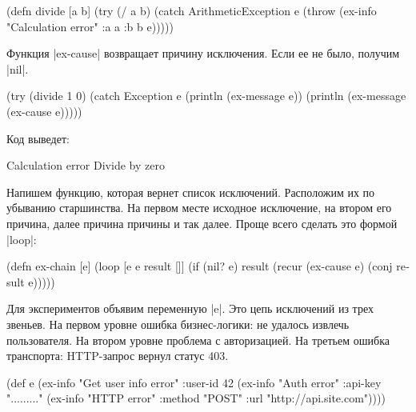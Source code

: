 \begin{english}
  \begin{clojure}
(defn divide [a b]
  (try
    (/ a b)
    (catch ArithmeticException e
      (throw (ex-info
              "Calculation error"
              {:a a :b b}
              e)))))
  \end{clojure}
\end{english}

Функция \spverb|ex-cause| возвращает причину исключения. Если ее не было,
получим \spverb|nil|.

\begin{english}
  \begin{clojure}
(try
  (divide 1 0)
  (catch Exception e
    (println (ex-message e))
    (println (ex-message (ex-cause e)))))
  \end{clojure}
\end{english}

\noindent
Код выведет:

\begin{english}
  \begin{text}
Calculation error
Divide by zero
  \end{text}
\end{english}

Напишем функцию, которая вернет список исключений. Расположим их по убыванию
старшинства. На первом месте исходное исключение, на втором его причина, далее
причина причины и так далее. Проще всего сделать это формой \spverb|loop|:

\begin{english}
  \begin{clojure}
(defn ex-chain [e]
  (loop [e e
         result []]
    (if (nil? e)
      result
      (recur (ex-cause e) (conj result e)))))
  \end{clojure}
\end{english}

Для экспериментов объявим переменную \spverb|e|. Это цепь исключений из трех
звеньев. На первом уровне ошибка бизнес-логики: не удалось извлечь
пользователя. На втором уровне проблема с авторизацией. На третьем ошибка
транспорта: HTTP-запрос вернул статус 403.

\begin{english}
  \begin{clojure}
(def e
  (ex-info
   "Get user info error"
   {:user-id 42}
   (ex-info "Auth error"
            {:api-key "........."}
            (ex-info "HTTP error"
                     {:method "POST"
                      :url "http://api.site.com"}))))
  \end{clojure}
\end{english}

